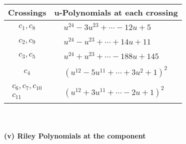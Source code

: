 \documentclass[1p]{elsarticle_modified}
\theoremstyle{definition}
\begin{document}
\begin{tabular}{m{50pt}|m{274pt}}
Crossings & \hspace{64pt}u-Polynomials at each crossing \\
\hline $$\begin{aligned}c_{1},c_{8}\end{aligned}$$&$\begin{aligned}
&u^{24}-3 u^{23}+\cdots-12 u+5
\end{aligned}$\\
\hline $$\begin{aligned}c_{2},c_{9}\end{aligned}$$&$\begin{aligned}
&u^{24}- u^{23}+\cdots+14 u+11
\end{aligned}$\\
\hline $$\begin{aligned}c_{3},c_{5}\end{aligned}$$&$\begin{aligned}
&u^{24}+u^{23}+\cdots-188 u+145
\end{aligned}$\\
\hline $$\begin{aligned}c_{4}\end{aligned}$$&$\begin{aligned}
&(u^{12}-5 u^{11}+\cdots+3 u^2+1)^{2}
\end{aligned}$\\
\hline $$\begin{aligned}c_{6},c_{7},c_{10}\\c_{11}\end{aligned}$$&$\begin{aligned}
&(u^{12}+3 u^{11}+\cdots-2 u+1)^{2}
\end{aligned}$\\
\hline
\end{tabular}\\~\\
\newpage\renewcommand{\arraystretch}{1}
\flushleft \textbf{(v) Riley Polynomials at the component}\newline \\
\end{document}
